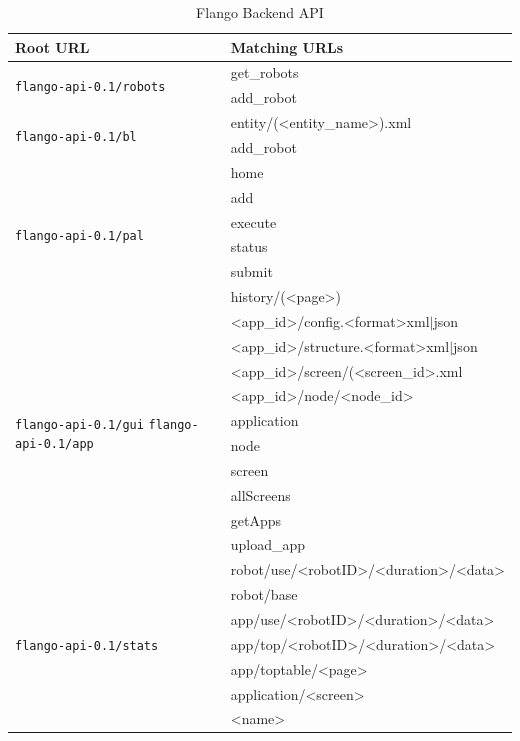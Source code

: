 \begin{table}[ht]
    \centering
    \begin{tabularx}{\linewidth}{| l | X |}
    \hline
    Root URL & Matching URLs \\
    \hline
    \multirow{2}{*}{\texttt{flango-api-0.1/robots}}
        & get\_robots \\ 
        & add\_robot \\
    \hline 
    
    \multirow{2}{*}{\texttt{flango-api-0.1/bl}} 
        & entity/(\textless entity\_name\textgreater).xml \\ 
        & add\_robot \\
    \hline
    
    \multirow{6}{*}{\texttt{flango-api-0.1/pal}} 
        & home \\
        & add \\
        & execute \\
        & status \\   
        & submit \\
        & history/(\textless page\textgreater) \\
    \hline
    
    \multirow{10}{2.5cm}{\texttt{flango-api-0.1/gui}  \texttt{flango-api-0.1/app}}
        & \textless app\_id\textgreater /config.\textless format\textgreater xml$|$json \\
        & \textless app\_id\textgreater /structure.\textless format\textgreater xml$|$json \\
        & \textless app\_id\textgreater /screen/(\textless screen\_id\textgreater.xml \\
        & \textless app\_id\textgreater /node/\textless node\_id\textgreater \\
        & application \\
        & node \\
        & screen \\
        & allScreens \\
        & getApps \\
        & upload\_app \\
    \hline
    
    \multirow{7}{*}{\texttt{flango-api-0.1/stats}}
        & robot/use/\textless robotID>/\textless duration\textgreater/<data\textgreater \\
        & robot/base \\
        & app/use/\textless robotID\textgreater/\textless duration\textgreater/<data\textgreater \\
        & app/top/\textless robotID\textgreater/\textless duration\textgreater/<data\textgreater \\
        & app/toptable/\textless page\textgreater \\
        & application/\textless screen\textgreater \\
        & \textless name\textgreater \\
    \hline
    \end{tabularx}
    \caption{Flango Backend \ac{API}}
    \label{tab:flango-api}
\end{table}
